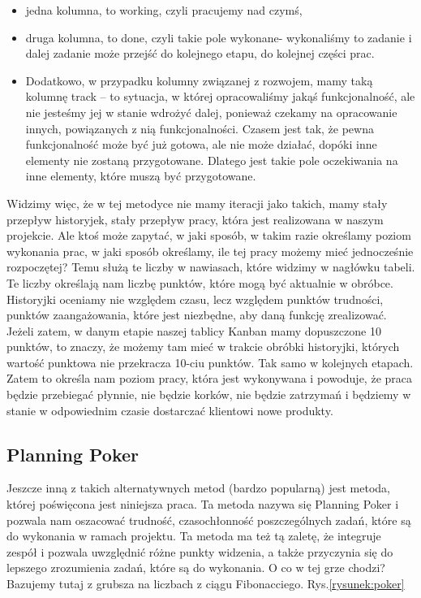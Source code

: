 \begin{itemize}
	\item jedna kolumna, to working, czyli pracujemy nad czymś,
	\item druga kolumna, to done, czyli takie pole wykonane- wykonaliśmy to zadanie i dalej zadanie może przejść do kolejnego etapu, do kolejnej części prac.
	\item Dodatkowo, w przypadku kolumny związanej z rozwojem, mamy taką kolumnę track – to sytuacja, w której opracowaliśmy jakąś funkcjonalność,
	ale nie jesteśmy jej w stanie wdrożyć dalej, ponieważ czekamy na opracowanie innych, powiązanych z nią funkcjonalności.
	Czasem jest tak, że pewna funkcjonalność może być już gotowa, ale nie może działać, dopóki inne elementy nie zostaną przygotowane.
	Dlatego jest takie pole oczekiwania na inne elementy, które muszą być przygotowane.
\end{itemize}

Widzimy więc, że w tej metodyce nie mamy iteracji jako takich, mamy stały przepływ historyjek, stały przepływ pracy, która jest realizowana w naszym projekcie.
Ale ktoś może zapytać, w jaki sposób, w takim razie określamy poziom wykonania prac, w jaki sposób określamy, ile tej pracy możemy mieć jednocześnie rozpoczętej? 
Temu służą te liczby w nawiasach, które widzimy w nagłówku tabeli. Te liczby określają nam liczbę punktów, które mogą być aktualnie w obróbce.
Historyjki oceniamy nie względem czasu, lecz względem punktów trudności, punktów zaangażowania, które jest niezbędne, aby daną funkcję zrealizować. 
Jeżeli zatem, w danym etapie naszej tablicy Kanban mamy dopuszczone 10 punktów, to znaczy, że możemy tam mieć w trakcie obróbki historyjki,
których wartość punktowa nie przekracza 10-ciu punktów. Tak samo w kolejnych etapach.
Zatem to określa nam poziom pracy, która jest wykonywana i powoduje, że praca będzie przebiegać płynnie,
nie będzie korków, nie będzie zatrzymań i będziemy w stanie w odpowiednim czasie dostarczać klientowi nowe produkty.

\subsection{Planning Poker}

Jeszcze inną z takich alternatywnych metod (bardzo popularną)  jest metoda, której poświęcona jest niniejsza praca.
Ta metoda nazywa się Planning Poker i pozwala nam oszacować trudność,
czasochłonność poszczególnych zadań, które są do wykonania w ramach projektu.
Ta metoda ma też tą zaletę, że integruje zespół i pozwala uwzględnić różne punkty widzenia,
a także przyczynia się do lepszego zrozumienia zadań, które są do wykonania.
O co w tej grze chodzi? Bazujemy tutaj z grubsza na liczbach z ciągu Fibonacciego. Rys.\ref{rysunek:poker}

